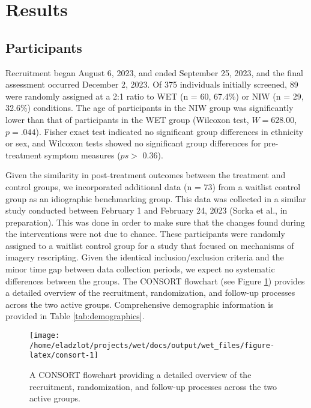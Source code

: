 \documentclass[
  man,floatsintext]{apa7}
\begin{document}
\section{Results}\label{results}

\subsection{Participants}\label{participants-1}

Recruitment began August 6, 2023, and ended September 25, 2023, and the final assessment occurred December 2, 2023.
Of 375 individuals initially screened,
89 were randomly assigned at a 2:1 ratio to WET (n = 60, 67.4\%) or NIW (n = 29, 32.6\%) conditions.
The age of participants in the NIW group was significantly lower than that of participants in the WET group (Wilcoxon test, \(W = 628.00\), \(p = .044\)).
Fisher exact test indicated no significant group differences in ethnicity or sex, and Wilcoxon tests showed no significant group differences for pre-treatment symptom measures (\(ps >\) 0.36).

Given the similarity in post-treatment outcomes between the treatment and control groups, we incorporated additional data (n = 73) from a waitlist control group as an idiographic benchmarking group.
This data was collected in a similar study conducted between February 1 and February 24, 2023 (Sorka et al., in preparation).
This was done in order to make sure that the changes found during the interventions were not due to chance.
These participants were randomly assigned to a waitlist control group for a study that focused on mechanisms of imagery rescripting.
Given the identical inclusion/exclusion criteria and the minor time gap between data collection periods, we expect no systematic differences between the groups.
The CONSORT flowchart (see Figure \ref{fig:consort}) provides a detailed overview of the recruitment, randomization, and follow-up processes across the two active groups.
Comprehensive demographic information is provided in Table \ref{tab:demographics}.



\begin{figure}
\texttt{[image: /home/eladzlot/projects/wet/docs/output/wet\_files/figure-latex/consort-1]} \caption{A CONSORT flowchart providing a detailed overview of the recruitment, randomization, and follow-up processes across the two active groups.}\label{fig:consort}
\end{figure}
\end{document}
